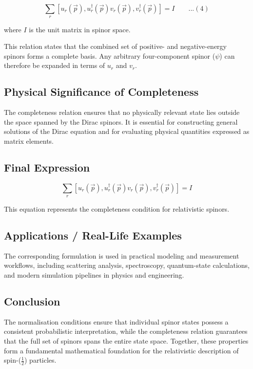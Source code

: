 \documentclass[12pt]{report}
\begin{document}
\begin{equation*}
\sum_r \left[ u_r(\vec{p}), u_r^\dagger(\vec{p})
v_r(\vec{p}), v_r^\dagger(\vec{p}) \right] = I\qquad ...(4)
\end{equation*}

where $I$ is the unit matrix in spinor space.

This relation states that the combined set of positive- and negative-energy spinors forms a complete basis. Any arbitrary four-component spinor ($\psi$) can therefore be expanded in terms of $u_r$ and $v_r$.

\subsection*{Physical Significance of Completeness}

The completeness relation ensures that no physically relevant state lies outside the space spanned by the Dirac spinors. It is essential for constructing general solutions of the Dirac equation and for evaluating physical quantities expressed as matrix elements.

\subsection*{Final Expression}

\begin{equation*}
\boxed{\sum_r \left[ u_r(\vec{p}), u_r^\dagger(\vec{p})
v_r(\vec{p}), v_r^\dagger(\vec{p}) \right] = I}
\end{equation*}

This equation represents the completeness condition for relativistic spinors.

\subsection*{Applications / Real-Life Examples}
The corresponding formulation is used in practical modeling and measurement workflows, including scattering analysis, spectroscopy, quantum-state calculations, and modern simulation pipelines in physics and engineering.

\subsection*{Conclusion}

The normalisation conditions ensure that individual spinor states possess a consistent probabilistic interpretation, while the completeness relation guarantees that the full set of spinors spans the entire state space. Together, these properties form a fundamental mathematical foundation for the relativistic description of spin-($\tfrac{1}{2}$) particles.
\end{document}

